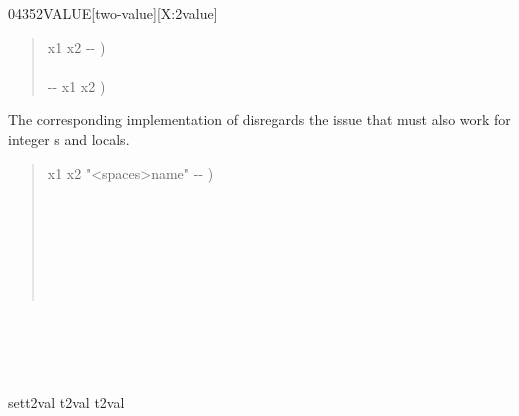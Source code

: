 \begin{worddef}{0435}{2VALUE}[two-value][X:2value]
\begin{implement}
		\begin{quote}\ttfamily
			\word{:}   x1 x2 -{}- ) \\
			\tab {} \word{,} \word{,} \\
			\tab {}   -{}- x1 x2 ) \\
			\word{;}
		\end{quote}

		The corresponding implementation of  disregards the
		issue that  must also work for integer s
		and locals.

		\begin{quote}\ttfamily
			\word{:}   x1 x2 "<spaces>name" -{}- ) \\
			\tab {}  \\
			\tab {}   \\
			\tab[2]     \\
			\tab {} \\
			\tab[2]  \\
			\tab {} \\
			\word{;} 
		\end{quote}
	\end{implement}

	\begin{testing}\ttfamily
		 \\
		 \\[2ex]
		 \\
		 \\[2ex]
		\word{:} sett2val t2val   t2val \word{;} \\
	\end{testing}
\end{worddef}

